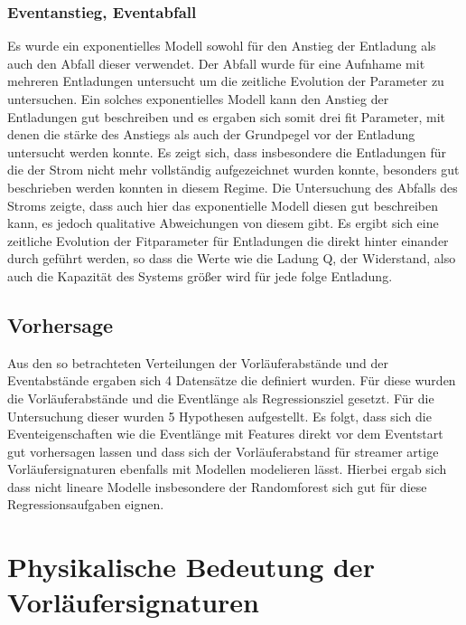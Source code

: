 \subsubsection{Eventanstieg, Eventabfall}
Es wurde ein exponentielles Modell sowohl für den Anstieg der Entladung als auch den Abfall dieser verwendet. Der Abfall wurde für eine Aufnhame mit mehreren Entladungen untersucht um die zeitliche Evolution der Parameter zu untersuchen. Ein solches exponentielles Modell kann den Anstieg der Entladungen gut beschreiben und es ergaben sich somit drei fit Parameter, mit denen die stärke des Anstiegs als auch der Grundpegel vor der Entladung untersucht werden konnte. Es zeigt sich, dass insbesondere die Entladungen für die der Strom nicht mehr vollständig aufgezeichnet wurden konnte, besonders gut beschrieben werden konnten in diesem Regime. Die Untersuchung des Abfalls des Stroms zeigte, dass auch hier das exponentielle Modell diesen gut beschreiben kann, es jedoch qualitative Abweichungen von diesem gibt. Es ergibt sich eine  zeitliche Evolution der Fitparameter für Entladungen die direkt hinter einander durch geführt werden, so dass die Werte wie die Ladung Q, der Widerstand, also auch die Kapazität des Systems größer wird für jede folge Entladung.

\subsection{Vorhersage}
Aus den so betrachteten Verteilungen der Vorläuferabstände und der Eventabstände ergaben sich 4 Datensätze die definiert wurden. Für diese wurden die Vorläuferabstände und die Eventlänge als Regressionsziel gesetzt. Für die Untersuchung dieser wurden 5 Hypothesen aufgestellt. Es folgt, dass sich die Eventeigenschaften wie die Eventlänge mit Features direkt vor dem Eventstart gut vorhersagen lassen und dass sich der Vorläuferabstand für streamer artige Vorläufersignaturen ebenfalls mit Modellen modelieren lässt. Hierbei ergab sich dass nicht lineare Modelle insbesondere der Randomforest sich gut für diese Regressionsaufgaben eignen. 



\section{Physikalische Bedeutung der Vorläufersignaturen}

